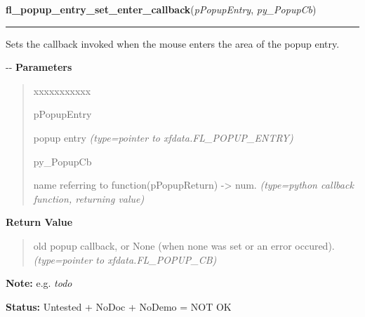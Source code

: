     \vspace{0.5ex}

\hspace{.8\funcindent}\begin{boxedminipage}{\funcwidth}

    \raggedright \textbf{fl\_popup\_entry\_set\_enter\_callback}(\textit{pPopupEntry}, \textit{py\_PopupCb})

    \vspace{-1.5ex}

    \rule{\textwidth}{0.5\fboxrule}
\setlength{\parskip}{2ex}

Sets the callback invoked when the mouse enters the area of the popup
entry.

-{}-
\setlength{\parskip}{1ex}
      \textbf{Parameters}
      \vspace{-1ex}

      \begin{quote}
        \begin{Ventry}{xxxxxxxxxxx}

          \item[pPopupEntry]


popup entry
            {\it (type=pointer to xfdata.FL\_POPUP\_ENTRY)}

          \item[py\_PopupCb]


name referring to function(pPopupReturn) -> num.
            {\it (type=python callback function, returning value)}

        \end{Ventry}

      \end{quote}

      \textbf{Return Value}
    \vspace{-1ex}

      \begin{quote}

old popup callback, or None (when none was set or an error
occured).
      {\it (type=pointer to xfdata.FL\_POPUP\_CB)}

      \end{quote}

\textbf{Note:} 
e.g. \emph{todo}


\textbf{Status:} 
Untested + NoDoc + NoDemo = NOT OK


    \end{boxedminipage}

    \label{xformslib:flpopup:fl_popup_entry_set_leave_callback}

